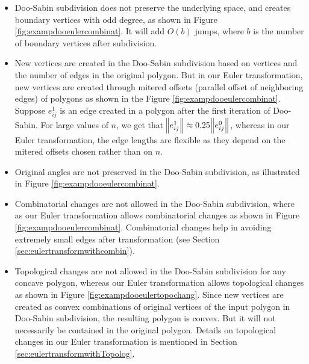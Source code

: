 \begin{itemize}
  \item
    Doo-Sabin subdivision does not preserve the underlying space, and creates boundary vertices with odd degree, as shown in Figure \ref{fig:exampdooeulercombinat}.
    It will add $O(b)$ jumps, where $b$ is the number of boundary vertices after subdivision.%
  \item
    New vertices are created in the Doo-Sabin subdivision based on vertices and the number of edges in the original polygon.
    But in our Euler transformation, new vertices are created through mitered offsets (parallel offset of neighboring edges) of polygons as shown in the Figure \ref{fig:exampdooeulercombinat}.
    Suppose $e_{ij}^1$ is an edge created in a polygon after the first iteration of Doo-Sabin.
    For large values of $n$, we get that $\norm{e_{ij}^1} \approx 0.25 \norm{e_{ij}^0}$, whereas in our Euler transformation, the edge lengths are flexible as they depend on the mitered offsets chosen rather than on $n$. 

  \item Original angles are not preserved in the Doo-Sabin subdivision, as illustrated in Figure \ref{fig:exampdooeulercombinat}. 

  \item Combinatorial changes are not allowed in the Doo-Sabin subdivision, where as our Euler transformation allows combinatorial changes as shown in Figure \ref{fig:exampdooeulercombinat}.
  Combinatorial changes help in avoiding extremely small edges after transformation (see Section \ref{sec:eulertransformwithcombin}). 

  \item Topological changes are not allowed in the Doo-Sabin subdivision for any concave polygon, whereas our Euler transformation allows topological changes as shown in Figure \ref{fig:exampdooeulertopochang}.
  Since new  vertices are created as convex combinations of original vertices of the input polygon in Doo-Sabin subdivision, the resulting polygon is convex.
  But it will not necessarily be contained in the original polygon.
  Details on topological changes in our Euler transformation is mentioned in Section \ref{sec:eulertransformwithTopolog}.      
\end{itemize}


